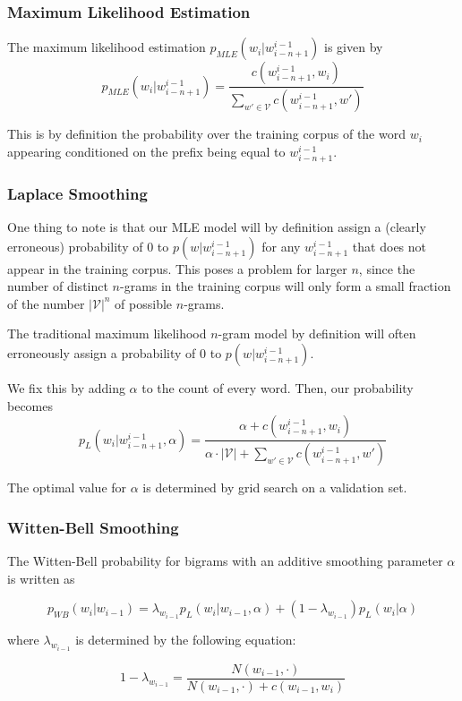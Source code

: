 \documentclass[11pt]{article}
\begin{document}
\subsubsection{Maximum Likelihood Estimation}

The maximum likelihood estimation $p_{MLE}(w_i|w^{i-1}_{i-n+1})$ is given by 
$$p_{MLE}(w_i|w^{i-1}_{i-n+1}) = \frac{c(w^{i-1}_{i-n+1}, w_i)}{\sum_{w' \in \mathcal{V}} c(w^{i-1}_{i-n+1}, w')}$$

This is by definition the probability over the training corpus of the word $w_i$ appearing conditioned on the prefix being equal to $w^{i-1}_{i-n+1}$. 

\subsubsection{Laplace Smoothing}

 One thing to note is that our MLE model will by definition assign a (clearly erroneous) probability of $0$ to $p(w|w^{i-1}_{i-n+1})$ for any $w^{i-1}_{i-n+1}$ that does not appear in the training corpus. This poses a problem for larger $n$, since the number of distinct $n$-grams in the training corpus will only form a small fraction of the number $|\mathcal{V}|^n$ of possible $n$-grams.

The traditional maximum likelihood $n$-gram model by definition will often erroneously assign a probability of $0$ to $p(w|w^{i-1}_{i-n+1})$. 

We fix this by adding $\alpha$ to the count of every word. Then, our probability becomes 
$$p_L(w_i|w^{i-1}_{i-n+1}, \alpha) = \frac{\alpha + c(w^{i-1}_{i-n+1}, w_i)}{\alpha \cdot |\mathcal{V}| + \sum_{w' \in \mathcal{V}} c(w^{i-1}_{i-n+1}, w')}$$

The optimal value for $\alpha$ is determined by grid search on a validation set. 

\subsubsection{Witten-Bell Smoothing}

The Witten-Bell probability for bigrams with an additive smoothing parameter $\alpha$ is written as

$$p_{WB}(w_i|w_{i-1}) = \lambda_{w_{i-1}} p_L(w_i|w_{i-1}, \alpha) + (1-\lambda_{w_{i-1}}) p_L(w_i| \alpha)$$

where $\lambda_{w_{i-1}}$ is determined by the following equation:

$$1 - \lambda_{w_{i-1}} = \frac{N(w_{i-1}, \cdot)}{N(w_{i-1}, \cdot) + c(w_{i-1}, w_i)}$$
\end{document}
